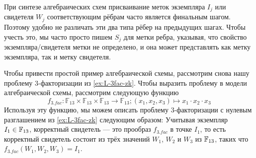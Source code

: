 \begin{notation}
При синтезе алгебраических схем присваивание меток экземпляра $I_j$ или свидетеля $W_j$ соответствующим рёбрам часто является финальным шагом. Поэтому удобно не различать эти два типа рёбер на предыдущих шагах. Чтобы учесть это, мы часто просто пишем $S_j$ для метки ребра, указывая, что свойство экземпляра/свидетеля метки не определено, и она может представлять как метку экземпляра, так и метку свидетеля. 
\end{notation}
\begin{example}
\label{ex:3-fac-zk-circuit} Чтобы привести простой пример алгебраической схемы, рассмотрим снова нашу проблему $3$-факторизации из \examplename{} \ref{ex:L-3fac-zk}. Чтобы выразить проблему в модели алгебраической схемы, рассмотрим следующую функцию 
\[
f_{3.fac}:\mathbb{F}_{13}\times\mathbb{F}_{13}\times\mathbb{F}_{13}\to\mathbb{F}_{13};(x_{1},x_{2},x_{3})\mapsto x_{1}\cdot x_{2}\cdot x_{3}
\]
Используя эту функцию, мы можем описать проблему $3$-факторизации с нулевым разглашением из \ref{ex:L-3fac-zk} следующим образом: Учитывая экземпляр $I_1\in \mathbb{F}_{13}$, корректный свидетель — это прообраз $f_{3.fac}$ в точке $I_1$, то есть корректный свидетель состоит из трёх значений $W_1$, $W_2$ и $W_3$ из $\mathbb{F}_{13}$, таких что $f_{3.fac}(W_1,W_2,W_3)=I_1$. 


\end{example}

